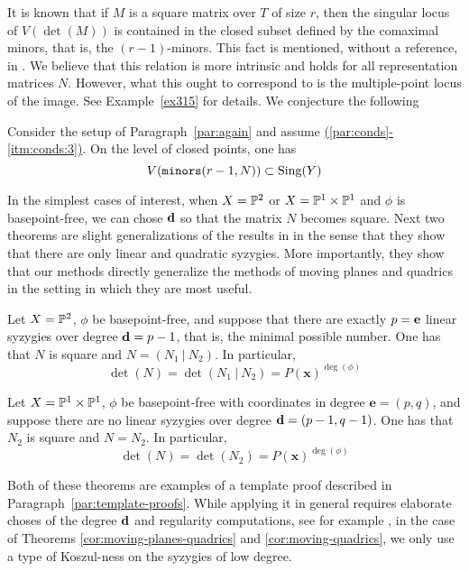 \documentclass[fleqn,reqno]{amsart}
\renewcommand{\itmref}[2]{{\normalfont\hyperref[#1]{(\ref*{#2}-\ref*{#1})}}}
\begin{document}
\begin{paragraf*}
It is known that if $M$ is a square matrix over $T$ of size $r$,
then the singular locus of $V(\det(M))$ is contained in the closed subset defined by the
comaximal minors, that is, the $(r-1)$-minors.
This fact is mentioned, without a reference, in \citet{BPT12}.
We believe that this relation is more intrinsic and holds for all representation matrices $N$.
However, what this ought to correspond to is the multiple-point locus of the image.
See Example~\ref{ex315} for details.
We conjecture the following
\end{paragraf*}

\begin{conjecture}
\label{conj:sing-locus}
Consider the setup of Paragraph~\ref{par:again} and assume \itmref{itm:conds:3}{par:conds}.
On the level of closed points, one has
\[
	V(\mathop{\tt minors}(r-1,N))\subset\mathrm{Sing}(Y)
\]
\end{conjecture}

\begin{paragraf*}
In the simplest cases of interest, when $X=\mathbb{P}^2$ or $X=\mathbb{P}^1\times\mathbb{P}^1$ and $\phi$ is basepoint-free,
we can chose $\mathbf d$ so that the matrix $N$ becomes square.
Next two theorems are slight generalizations of the results in \citet{CGZ-00}
in the sense that they show that there are only linear and quadratic syzygies.
More importantly, they show that our methods directly generalize the methods of
moving planes and quadrics in the setting in which they are most useful.
\end{paragraf*}

\begin{theorem}
\label{cor:moving-planes-quadrics}
Let $X=\mathbb{P}^2$, $\phi$ be basepoint-free,
and suppose that there are exactly $p=\mathbf e$ linear syzygies over degree $\mathbf d=p-1$,
that is, the minimal possible number.
One has that $N$ is square and $N=(N_1~|~N_2)$.
In particular,
\[
	\det(N)=\det(N_1~|~N_2)=P(\mathbf x)^{\deg(\phi)}
\]
\end{theorem}

\begin{theorem}
\label{cor:moving-quadrics}
Let $X=\mathbb{P}^1\times\mathbb{P}^1$, $\phi$ be basepoint-free with coordinates in degree $\mathbf e=(p,q)$,
and suppose there are no linear syzygies over degree $\mathbf d=(p-1,q-1)$.
One has that $N_2$ is square and $N=N_2$.
In particular,
\[
	\det(N)=\det(N_2)=P(\mathbf x)^{\deg(\phi)}
\]
\end{theorem}

\begin{paragraf*}
Both of these theorems are examples of a template proof
described in Paragraph~\ref{par:template-proofs}.
While applying it in general requires elaborate choses of the degree $\mathbf d$ and
regularity computations, see for example \citet{AHW-05},
in the case of Theorems \ref{cor:moving-planes-quadrics} and \ref{cor:moving-quadrics},
we only use a type of Koszul-ness on the syzygies of low degree.
\end{paragraf*}
\end{document}
